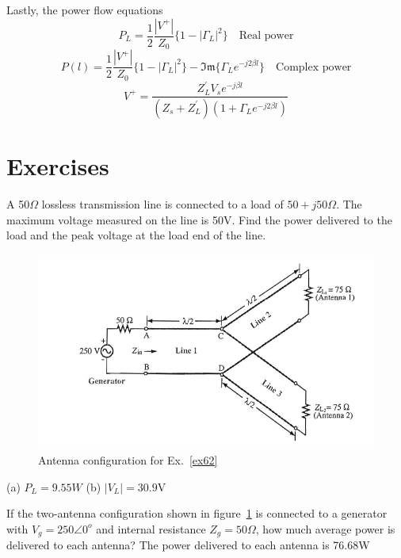 Lastly, the power flow equations
\begin{dmath*}
P_L = \frac{1}{2}\frac{|V^+|}{Z_0}\lbrace 1 - |\Gamma_L|^2\rbrace\quad\text{Real power}
\end{dmath*}
\begin{dmath*}
P(l) = \frac{1}{2}\frac{|V^+|}{Z_0}\lbrace 1 - |\Gamma_L|^2\rbrace - \mathfrak{Im}\lbrace \Gamma_L e^{- j2\beta l}\rbrace\quad\text{Complex power}
\end{dmath*}
\[
V^+ = \frac{Z_L^{'}V_s e^{-j\beta l}}{(Z_s + Z_L^{'})(1 + \Gamma_L e^{-j2\beta l})}
\]

\section*{Exercises}
\begin{ExerciseList}
\Exercise[label={ex61}]
A 50$\Omega$ lossless transmission line is connected to a load of $50 + j50\Omega$. The maximum voltage measured on the line is 50V. Find the power delivered to the load and the peak voltage at the load end of the line.
\begin{figure}[h]
\centering
\includegraphics[width=1\linewidth]{./graphics/antenna_power_problem}
\caption{Antenna configuration for Ex.~\ref{ex62}}
\label{fig:antennapowerproblem}
\end{figure}
\Answer[ref={ex61}]
(a) $P_L = 9.55W$ (b) $|V_L| = 30.9$V

\Exercise[label={ex62}]
If the two-antenna configuration shown in figure~\ref{fig:antennapowerproblem} is connected to a generator with $V_g = 250\angle0^o$ and internal resistance $Z_g = 50\varOmega$, how much average power is delivered to each antenna?
\Answer[ref={ex62}]
The power delivered to each antenna is 76.68W
\end{ExerciseList}